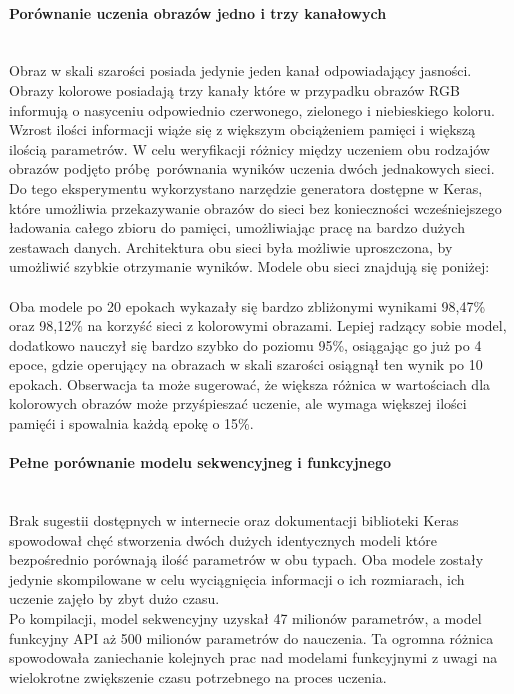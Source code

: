 \paragraph{Porównanie uczenia obrazów jedno i trzy kanałowych} \mbox{}\\
Obraz w skali szarości posiada jedynie jeden kanał odpowiadający jasności. Obrazy kolorowe
posiadają trzy kanały które w przypadku obrazów RGB informują o nasyceniu odpowiednio
czerwonego, zielonego i niebieskiego koloru. Wzrost ilości informacji wiąże się z większym
obciążeniem pamięci i większą ilością parametrów. W celu weryfikacji różnicy między
uczeniem obu rodzajów obrazów podjęto próbę porównania wyników uczenia dwóch jednakowych sieci.\\
Do tego eksperymentu wykorzystano narzędzie generatora dostępne w Keras, które umożliwia
przekazywanie obrazów do sieci bez konieczności wcześniejszego ładowania całego zbioru
do pamięci, umożliwiając pracę na bardzo dużych zestawach danych. Architektura obu
sieci była możliwie uproszczona, by umożliwić szybkie otrzymanie wyników. Modele
obu sieci znajdują się poniżej:\\\\
Oba modele po 20 epokach wykazały się bardzo zbliżonymi wynikami 98,47\% oraz 98,12\%
na korzyść sieci z kolorowymi obrazami. Lepiej radzący sobie model, dodatkowo nauczył
się bardzo szybko do poziomu 95\%, osiągając go już po 4 epoce, gdzie operujący na
obrazach w skali szarości osiągnął ten wynik po 10 epokach. Obserwacja ta może sugerować,
że większa różnica w wartościach dla kolorowych obrazów może przyśpieszać uczenie, ale
wymaga większej ilości pamięći i spowalnia każdą epokę o 15\%.

\paragraph{Pełne porównanie modelu sekwencyjneg i funkcyjnego} \mbox{}\\
Brak sugestii dostępnych w internecie oraz dokumentacji biblioteki Keras spowodował
chęć stworzenia dwóch dużych identycznych modeli które bezpośrednio porównają ilość
parametrów w obu typach. Oba modele zostały jedynie skompilowane w celu wyciągnięcia
informacji o ich rozmiarach, ich uczenie zajęło by zbyt dużo czasu.\\
Po kompilacji, model sekwencyjny uzyskał 47 milionów parametrów, a model funkcyjny API
aż 500 milionów parametrów do nauczenia. Ta ogromna różnica spowodowała zaniechanie
kolejnych prac nad modelami funkcyjnymi z uwagi na wielokrotne zwiększenie czasu potrzebnego
na proces uczenia.

